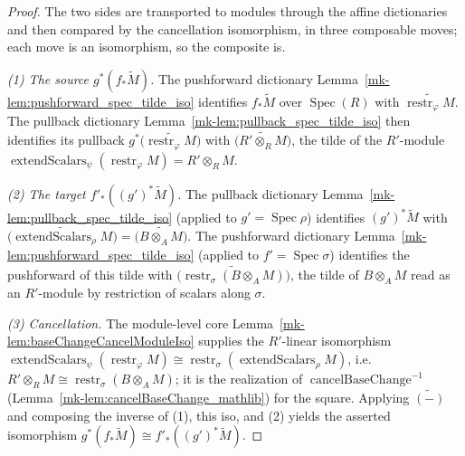 \begin{lemma}
\end{lemma}

\begin{proof}
  \leanok
        The two sides are transported to modules through the affine dictionaries and then
  compared by the cancellation isomorphism, in three composable moves; each move is an
  isomorphism, so the composite is.

  \emph{(1) The source \(g^*(f_*\widetilde{M})\).} The pushforward dictionary
  Lemma~\ref{mk-lem:pushforward_spec_tilde_iso} identifies \(f_*\widetilde{M}\) over
  \(\operatorname{Spec}(R)\) with \(\widetilde{\operatorname{restr}_\varphi M}\). The
  pullback dictionary Lemma~\ref{mk-lem:pullback_spec_tilde_iso} then identifies its
  pullback \(g^*\bigl(\widetilde{\operatorname{restr}_\varphi M}\bigr)\) with
  \(\widetilde{\bigl(R' \otimes_R M\bigr)}\), the tilde of the \(R'\)-module
  \(\operatorname{extendScalars}_\psi(\operatorname{restr}_\varphi M) = R' \otimes_R M\).

  \emph{(2) The target \(f'_*((g')^*\widetilde{M})\).} The pullback dictionary
  Lemma~\ref{mk-lem:pullback_spec_tilde_iso} (applied to \(g' = \operatorname{Spec}\rho\))
  identifies \((g')^*\widetilde{M}\) with
  \(\widetilde{\bigl(\operatorname{extendScalars}_\rho M\bigr)}
  = \widetilde{\bigl(B \otimes_A M\bigr)}\). The pushforward dictionary
  Lemma~\ref{mk-lem:pushforward_spec_tilde_iso} (applied to
  \(f' = \operatorname{Spec}\sigma\)) identifies the pushforward of this tilde with
  \(\widetilde{\bigl(\operatorname{restr}_\sigma(B \otimes_A M)\bigr)}\), the tilde of
  \(B \otimes_A M\) read as an \(R'\)-module by restriction of scalars along \(\sigma\).

  \emph{(3) Cancellation.} The module-level core
  Lemma~\ref{mk-lem:baseChangeCancelModuleIso} supplies the \(R'\)-linear isomorphism
  \(\operatorname{extendScalars}_\psi(\operatorname{restr}_\varphi M) \cong
  \operatorname{restr}_\sigma(\operatorname{extendScalars}_\rho M)\), i.e.\
  \(R' \otimes_R M \cong \operatorname{restr}_\sigma(B \otimes_A M)\); it is the
  realization of \(\operatorname{cancelBaseChange}^{-1}\)
  (Lemma~\ref{mk-lem:cancelBaseChange_mathlib}) for the square. Applying
  \(\widetilde{(-)}\) and composing the inverse of (1), this iso, and (2) yields the
  asserted isomorphism \(g^*(f_*\widetilde{M}) \cong f'_*((g')^*\widetilde{M})\).


\end{proof}
